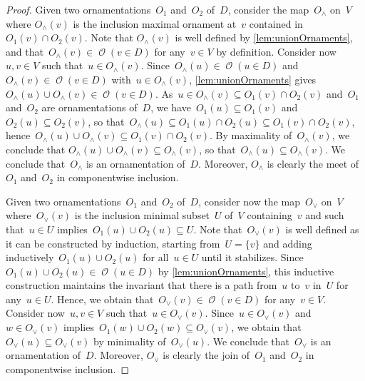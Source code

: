 \documentclass{amsart}
\theoremstyle{definition}
\renewcommand{\c}[1]{\mathcal{#1}} %
\newcommand{\set}[2]{\left\{ #1 \;\middle|\; #2 \right\}} %
\newcommand{\meet}{\wedge} %
\newcommand{\join}{\vee} %
\DeclareMathOperator{\Orn}{\c{O}}  %
\begin{document}
\begin{proof}
%
Given two ornamentations~$O_1$ and~$O_2$ of~$D$, consider the map~$O_\meet$ on~$V$ where $O_\meet(v)$ is the inclusion maximal ornament at~$v$ contained in~$O_1(v) \cap O_2(v)$.
Note that $O_\meet(v)$ is well defined by \cref{lem:unionOrnaments}, and that~$O_\meet(v) \in \Orn(v \in D)$ for any~$v \in V$ by definition.
Consider now~$u,v \in V$ such that~$u \in O_\meet(v)$.
Since~$O_\meet(u) \in \Orn(u \in D)$ and~$O_\meet(v) \in \Orn(v \in D)$ with~${u \in O_\meet(v)}$, \cref{lem:unionOrnaments} gives~$O_\meet(u) \cup O_\meet(v) \in \Orn(v \in D)$.
As~$u \in O_\meet(v) \subseteq O_1(v) \cap O_2(v)$ and~$O_1$ and~$O_2$ are ornamentations of~$D$, we have~$O_1(u) \subseteq O_1(v)$ and~$O_2(u) \subseteq O_2(v)$, so that~$O_\meet(u) \subseteq O_1(u) \cap O_2(u) \subseteq O_1(v) \cap O_2(v)$, hence~$O_\meet(u) \cup O_\meet(v) \subseteq O_1(v) \cap O_2(v)$.
By maximality of~$O_\meet(v)$, we conclude that $O_\meet(u) \cup O_\meet(v) \subseteq O_\meet(v)$, so that~$O_\meet(u) \subseteq O_\meet(v)$.
We conclude that~$O_\meet$ is an ornamentation of~$D$.
Moreover, $O_\meet$ is clearly the meet of~$O_1$ and~$O_2$ in componentwise inclusion.

Given two ornamentations~$O_1$ and~$O_2$ of~$D$, consider now the map~$O_\join$ on~$V$ where~$O_\join(v)$ is the inclusion minimal subset~$U$ of~$V$ containing~$v$ and such that~$u \in U$ implies~$O_1(u) \cup O_2(u) \subseteq U$.
Note that~$O_\join(v)$ is well defined as it can be constructed by induction, starting from~$U = \{v\}$ and adding inductively~$O_1(u) \cup O_2(u)$ for all~$u \in U$ until it stabilizes.
Since~$O_1(u) \cup O_2(u) \in \Orn(u \in D)$ by \cref{lem:unionOrnaments}, this inductive construction maintains the invariant that there is a path from~$u$ to~$v$ in~$U$ for any~$u \in U$.
Hence, we obtain that~$O_\join(v) \in \Orn(v \in D)$ for any~$v \in V$.
Consider now~$u,v \in V$ such that~$u \in O_\join(v)$.
Since~$u \in O_\join(v)$ and~$w \in O_\join(v)$ implies~$O_1(w) \cup O_2(w) \subseteq O_\join(v)$, we obtain that~$O_\join(u) \subseteq O_\join(v)$ by minimality of~$O_\join(u)$.
We conclude that~$O_\join$ is an ornamentation of~$D$.
Moreover, $O_\join$ is clearly the join of~$O_1$ and~$O_2$ in componentwise inclusion.
\end{proof}
\end{document}

